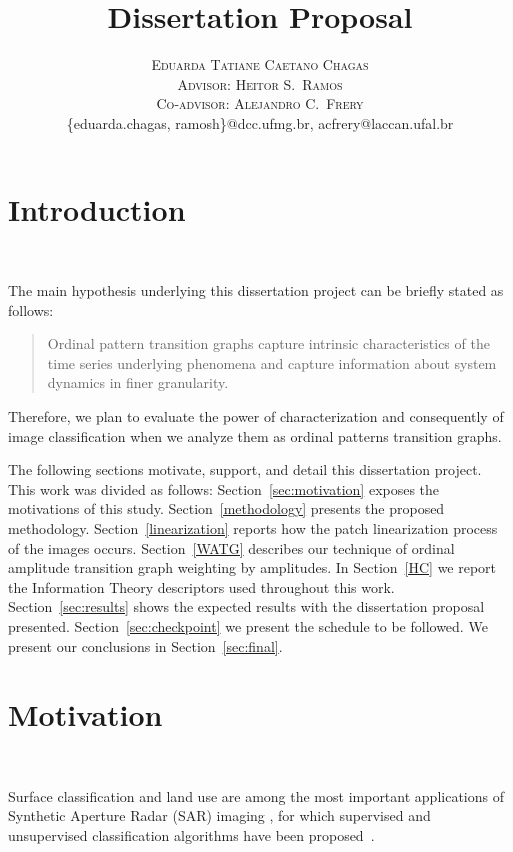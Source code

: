 \documentclass[paper=letter, fontsize=12pt]{article}
\title{\vspace{-10mm}\fontsize{24pt}{10pt}\selectfont\textbf{ 
Dissertation Proposal \\ \vspace{8mm} \normalfont{A study about ordinal patterns transition graphs}}}
\author{
\large
{\textsc{Eduarda Tatiane Caetano Chagas}}\\[2mm]
{\textsc{Advisor: Heitor S.\ Ramos}}\\[2mm]
{\textsc{Co-advisor: Alejandro C.\ Frery}}\\[2mm]
\normalsize {\{eduarda.chagas, ramosh\}@dcc.ufmg.br, acfrery@laccan.ufal.br}\\[2mm]
}
\date{}
\begin{document}
\maketitle 
\thispagestyle{fancy}

\onehalfspacing 

\section{Introduction}~\label{sec:introduction}

The main hypothesis underlying this dissertation project can be briefly stated as follows:

\begin{quote}

    Ordinal pattern transition graphs capture intrinsic characteristics of the time series underlying phenomena and capture information about system dynamics in finer granularity.
    
\end{quote}

Therefore, we plan to evaluate the power of characterization and consequently of image classification when we analyze them as ordinal patterns transition graphs.

The following sections motivate, support, and detail this dissertation project.
This work was divided as follows:
Section~\ref{sec:motivation} exposes the motivations of this study.
Section~\ref{methodology} presents the proposed methodology.
Section~\ref{linearization} reports how the patch linearization process of the images occurs.
Section~\ref{WATG} describes our technique of ordinal amplitude transition graph weighting by amplitudes.
In Section~\ref{HC} we report the Information Theory descriptors used throughout this work.
Section~\ref{sec:results} shows the expected results with the dissertation proposal presented.
Section~\ref{sec:checkpoint} we present the schedule to be followed.
We present our conclusions in Section~\ref{sec:final}.


\section{Motivation}~\label{sec:motivation}

Surface classification and land use are among the most important applications of Synthetic Aperture Radar (SAR) imaging \cite{Pottier2004Unsupervised}, for which supervised and unsupervised classification algorithms have been proposed~\cite{Bhattacharya2018Unsupervised,Chen1996multifrequency,ZYL1992Bayesian}.
\end{document}
